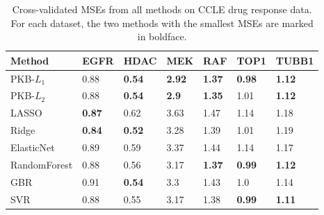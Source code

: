 \documentclass[a4paper,12pt]{article}
\begin{document}
\begin{table}[htp]
	\centering
	\begin{tabular}{lllllll}
		\hline
		Method       & EGFR          & HDAC          & MEK           & RAF           & TOP1          & TUBB1         \\ \hline
		PKB-$L_1$       & 0.88          & \textbf{0.54} & \textbf{2.92} & \textbf{1.37} & \textbf{0.98} & \textbf{1.12} \\
		PKB-$L_2$       & 0.88          & \textbf{0.54} & \textbf{2.9}  & \textbf{1.35} & 1.01          & \textbf{1.12} \\
		LASSO        & \textbf{0.87} & 0.62          & 3.63          & 1.47          & 1.14          & 1.18          \\
		Ridge        & \textbf{0.84} & \textbf{0.52} & 3.28          & 1.39          & 1.01          & 1.19          \\
		ElasticNet   & 0.89          & 0.59          & 3.37          & 1.44          & 1.14          & 1.17          \\
		RandomForest & 0.88          & 0.56          & 3.17          & \textbf{1.37} & \textbf{0.99} & \textbf{1.12} \\
		GBR          & 0.91          & \textbf{0.54} & 3.3           & 1.43          & 1.0           & 1.14          \\
		SVR          & 0.88          & 0.55          & 3.17          & 1.38          & \textbf{0.99} & \textbf{1.11} \\ \hline
	\end{tabular}
	\caption{Cross-validated MSEs from all methods on CCLE drug response data. For each dataset, the two methods with the smallest MSEs are marked in boldface.}
	\label{tab:ccle_mean}
\end{table}

\newpage
\end{document}
